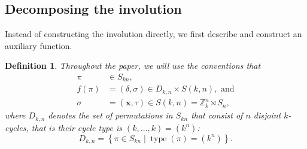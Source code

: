 \documentclass{article}
\numberwithin{theorem}{section}
\newtheorem{definition}[theorem]{Definition}
\theoremstyle{definition}
\newcommand{\x}{\mathbf x}
\newcommand{\xtau}{(\x,\tau)}
\begin{document}
\subsection{Decomposing the involution}
Instead of constructing the involution directly, we first describe and construct an auxiliary function.

\begin{definition}
    Throughout the paper, we will use the conventions that \begin{align*}
        \pi &\in S_{kn}, \\
        f(\pi) &= (\delta, \sigma) \in D_{k,n} \times S(k,n),\text{ and} \\
        \sigma &= \xtau \in S(k,n) = \mathbb{Z}_k^n \rtimes S_n,
    \end{align*} where
    $D_{k,n}$ denotes the set of permutations in $S_{kn}$ that consist of $n$ disjoint $k$-cycles, that is their cycle type is $(k,\dots,k) = (k^n)$:
    \[
        D_{k,n} = \left\{\pi\in S_{kn} \mid \operatorname{type}(\pi) = (k^n) \right\}.
    \]
\end{definition}
\end{document}

